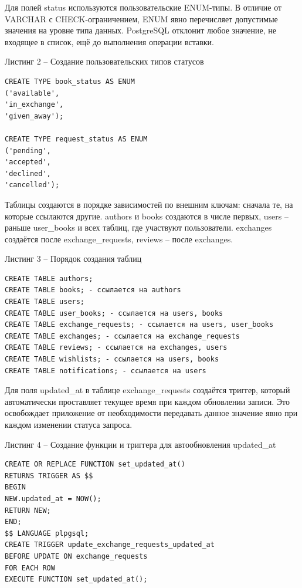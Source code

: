 \documentclass[14pt,a4paper]{extarticle}
\begin{document}
Для полей status используются пользовательские ENUM-типы. В отличие от
VARCHAR с CHECK-ограничением, ENUM явно перечисляет допустимые значения
на уровне типа данных. PostgreSQL отклонит любое значение, не входящее в
список, ещё до выполнения операции вставки.

\begin{center}
Листинг 2 -- Создание пользовательских типов статусов
\end{center}
\begin{lstlisting}
CREATE TYPE book_status AS ENUM
('available',
'in_exchange',
'given_away');

CREATE TYPE request_status AS ENUM
('pending',
'accepted',
'declined',
'cancelled');
\end{lstlisting}

Таблицы создаются в порядке зависимостей по внешним ключам: сначала те,
на которые ссылаются другие. authors и books создаются в числе первых,
users -- раньше user\_books и всех таблиц, где участвуют пользователи.
exchanges создаётся после exchange\_requests, reviews -- после
exchanges.

\begin{center}
Листинг 3 -- Порядок создания таблиц
\end{center}
\begin{lstlisting}
CREATE TABLE authors;
CREATE TABLE books; - ссылается на authors
CREATE TABLE users;
CREATE TABLE user_books; - ссылается на users, books
CREATE TABLE exchange_requests; - ссылается на users, user_books
CREATE TABLE exchanges; - ссылается на exchange_requests
CREATE TABLE reviews; - ссылается на exchanges, users
CREATE TABLE wishlists; - ссылается на users, books
CREATE TABLE notifications; - ссылается на users
\end{lstlisting}

Для поля updated\_at в таблице exchange\_requests создаётся триггер,
который автоматически проставляет текущее время при каждом обновлении
записи. Это освобождает приложение от необходимости передавать данное
значение явно при каждом изменении статуса запроса.

\begin{center}
Листинг 4 -- Создание функции и триггера для автообновления updated\_at
\end{center}
\begin{lstlisting}
CREATE OR REPLACE FUNCTION set_updated_at()
RETURNS TRIGGER AS $$
BEGIN
NEW.updated_at = NOW();
RETURN NEW;
END;
$$ LANGUAGE plpgsql;
CREATE TRIGGER update_exchange_requests_updated_at
BEFORE UPDATE ON exchange_requests
FOR EACH ROW
EXECUTE FUNCTION set_updated_at();
\end{lstlisting}
\end{document}
